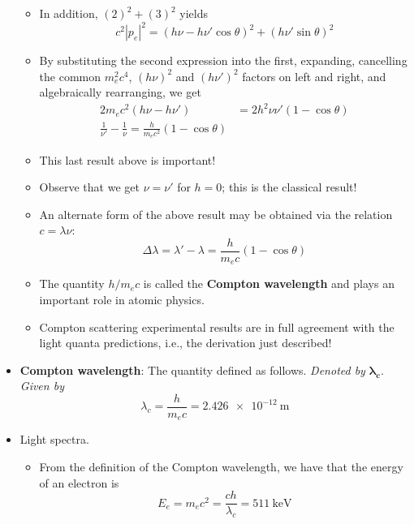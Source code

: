 \documentclass[../notes.tex]{subfiles}
\begin{document}
\begin{itemize}
\begin{itemize}
\begin{equation*}
        \end{equation*}
        \item In addition, $(2)^2+(3)^2$ yields
        \begin{equation*}
            c^2|p_e|^2 = (h\nu-h\nu'\cos\theta)^2+(h\nu'\sin\theta)^2
        \end{equation*}
        \item By substituting the second expression into the first, expanding, cancelling the common $m_e^2c^4$, $(h\nu)^2$ and $(h\nu')^2$ factors on left and right, and algebraically rearranging, we get
        \begin{align*}
            2m_ec^2(h\nu-h\nu') &= 2h^2\nu\nu'(1-\cos\theta)\\
            \frac{1}{\nu'}-\frac{1}{\nu} = \frac{h}{m_ec^2}(1-\cos\theta)
        \end{align*}
        \item This last result above is important!
        \item Observe that we get $\nu=\nu'$ for $h=0$; this is the classical result!
        \item An alternate form of the above result may be obtained via the relation $c=\lambda\nu$:
        \begin{equation*}
            \Delta\lambda = \lambda'-\lambda = \frac{h}{m_ec}(1-\cos\theta)
        \end{equation*}
        \item The quantity $h/m_ec$ is called the \textbf{Compton wavelength} and plays an important role in atomic physics.
        \item Compton scattering experimental results are in full agreement with the light quanta predictions, i.e., the derivation just described!
    \end{itemize}
    \item \textbf{Compton wavelength}: The quantity defined as follows. \emph{Denoted by} $\bm{\lambda_c}$. \emph{Given by}
    \begin{equation*}
        \lambda_c = \frac{h}{m_ec} = \SI{2.426e-12}{\meter}
    \end{equation*}
    \item Light spectra.
    \begin{itemize}
        \item From the definition of the Compton wavelength, we have that the energy of an electron is
        \begin{equation*}
            E_e = m_ec^2 = \frac{ch}{\lambda_c} = \SI{511}{\kilo\electronvolt}

\end{equation*}
\end{itemize}
\end{itemize}
\end{document}
